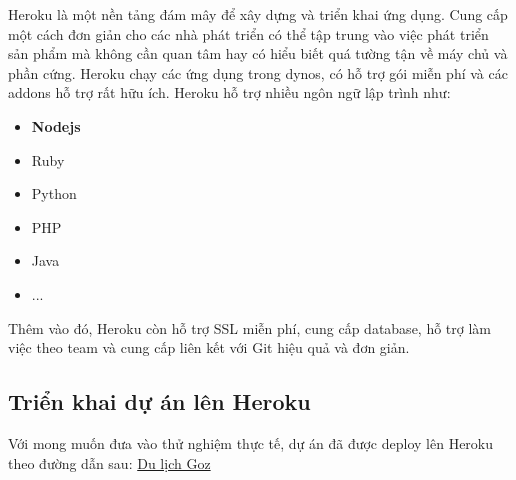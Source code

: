 Heroku là một nền tảng đám mây để xây dựng và triển khai ứng dụng. Cung cấp một cách đơn giản cho các nhà phát triển có thể tập trung vào việc phát triển sản phẩm mà không cần quan tâm hay có hiểu biết quá tường tận về máy chủ và phần cứng.
Heroku chạy các ứng dụng trong dynos, có hỗ trợ gói miễn phí và các addons hỗ trợ rất hữu ích. Heroku hỗ trợ nhiều ngôn ngữ lập trình như:

\begin{itemize}
    \item \textbf{Nodejs}
    \item Ruby
    \item Python
    \item PHP
    \item Java
    \item ...
\end{itemize}
Thêm vào đó, Heroku còn hỗ trợ SSL miễn phí, cung cấp database, hỗ trợ làm việc theo team và cung cấp liên kết với Git hiệu quả và đơn giản.

\subsection{Triển khai dự án lên Heroku}
Với mong muốn đưa vào thử nghiệm thực tế, dự án đã được deploy lên Heroku theo đường dẫn sau: 
\href{https://travelgoz.com/vi/}{Du lịch Goz}








